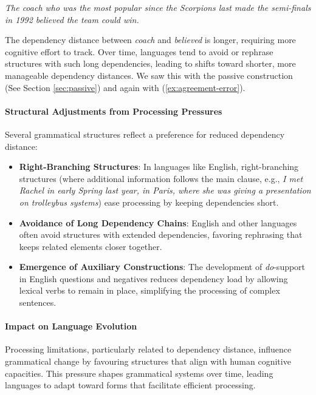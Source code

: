 \ea
\textit{The coach who was the most popular since the Scorpions last made the semi-finals in 1992 believed the team could win.}
\z

The dependency distance between \textit{coach} and \textit{believed} is longer, requiring more cognitive effort to track. Over time, languages tend to avoid or rephrase structures with such long dependencies, leading to shifts toward shorter, more manageable dependency distances. We saw this with the passive construction (See Section \ref{sec:passive}) and again with (\ref{ex:agreement-error}).

\paragraph*{Structural Adjustments from Processing Pressures}

Several grammatical structures reflect a preference for reduced dependency distance:
\begin{itemize}[noitemsep]
    \item \textbf{Right-Branching Structures}: In languages like English, right-branching structures (where additional information follows the main clause, e.g., \textit{I met Rachel in early Spring last year, in Paris, where she was giving a presentation on trolleybus systems}) ease processing by keeping dependencies short.
    
    \item \textbf{Avoidance of Long Dependency Chains}: English and other languages often avoid structures with extended dependencies, favoring rephrasing that keeps related elements closer together.
    
    \item \textbf{Emergence of Auxiliary Constructions}: The development of \textit{do}-support in English questions and negatives reduces dependency load by allowing lexical verbs to remain in place, simplifying the processing of complex sentences.
\end{itemize}

\paragraph*{Impact on Language Evolution}

Processing limitations, particularly related to dependency distance, influence grammatical change by favouring structures that align with human cognitive capacities. This pressure shapes grammatical systems over time, leading languages to adapt toward forms that facilitate efficient processing.


